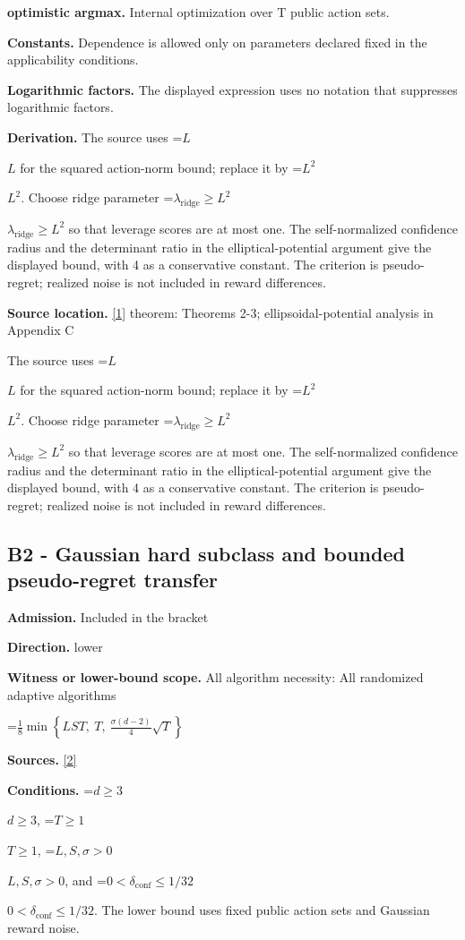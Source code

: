 \documentclass[10pt,a4paper]{article}
\newcommand{\AtlasMath}[1]{\par\begingroup\centering\setbox0=\hbox{$\displaystyle #1$}\ifdim\wd0>1.4\linewidth\typeout{ATLAS WIDE FORMULA: \the\wd0}\fi\ifdim\wd0>\linewidth\resizebox{\linewidth}{!}{\box0}\else\box0\fi\par\endgroup}
\newcommand{\AtlasInlineMath}[1]{\begingroup\setbox0=\hbox{$#1$}\ifdim\wd0>.4\linewidth\endgroup\AtlasMath{#1}\else\endgroup$#1$\fi}
\begin{document}
\textbf{optimistic argmax.} Internal optimization over T public action sets.

\textbf{Constants.} Dependence is allowed only on parameters declared fixed in the applicability conditions.

\textbf{Logarithmic factors.} The displayed expression uses no notation that suppresses logarithmic factors.

\textbf{Derivation.} The source uses \AtlasInlineMath{L} for the squared action-norm bound; replace it by \AtlasInlineMath{L^2}. Choose ridge parameter \AtlasInlineMath{\lambda_{\mathrm{ridge}}\ge L^2} so that leverage scores are at most one. The self-normalized confidence radius and the determinant ratio in the elliptical-potential argument give the displayed bound, with 4 as a conservative constant. The criterion is pseudo-regret; realized noise is not included in reward differences.

\textbf{Source location.} \href{https://proceedings.neurips.cc/paper/2011/file/e1d5be1c7f2f456670de3d53c7b54f4a-Paper.pdf}{[1]} theorem: Theorems 2-3; ellipsoidal-potential analysis in Appendix C

The source uses \AtlasInlineMath{L} for the squared action-norm bound; replace it by \AtlasInlineMath{L^2}. Choose ridge parameter \AtlasInlineMath{\lambda_{\mathrm{ridge}}\ge L^2} so that leverage scores are at most one. The self-normalized confidence radius and the determinant ratio in the elliptical-potential argument give the displayed bound, with 4 as a conservative constant. The criterion is pseudo-regret; realized noise is not included in reward differences.

\subsection{B2 - Gaussian hard subclass and bounded pseudo-regret transfer}
\textbf{Admission.} Included in the bracket

\textbf{Direction.} lower

\textbf{Witness or lower-bound scope.} All algorithm necessity: All randomized adaptive algorithms

\AtlasMath{\frac18\min\!\left\{LST,\ T,\ \frac{\sigma(d-2)}4\sqrt T\right\}}
\textbf{Sources.} \href{https://arxiv.org/abs/2502.17175v1}{[2]}

\textbf{Conditions.} \AtlasInlineMath{d\ge3}, \AtlasInlineMath{T\ge1}, \AtlasInlineMath{L,S,\sigma>0}, and \AtlasInlineMath{0<\delta_{\mathrm{conf}}\le1/32}. The lower bound uses fixed public action sets and Gaussian reward noise.
\end{document}
